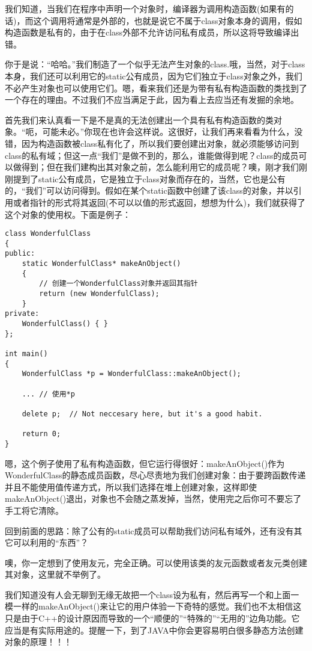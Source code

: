 我们知道，当我们在程序中声明一个对象时，编译器为调用构造函数(如果有的话)，而这个调用将通常是外部的，也就是说它不属于class对象本身的调用，假如构造函数是私有的，由于在class外部不允许访问私有成员，所以这将导致编译出错。

你于是说：“哈哈。”我们制造了一个似乎无法产生对象的class.哦，当然，对于class本身，我们还可以利用它的static公有成员，因为它们独立于class对象之外，我们不必产生对象也可以使用它们。嗯，看来我们还是为带有私有构造函数的类找到了一个存在的理由。不过我们不应当满足于此，因为看上去应当还有发掘的余地。

首先我们来认真看一下是不是真的无法创建出一个具有私有构造函数的类对象。“呃，可能未必。”你现在也许会这样说。这很好，让我们再来看看为什么，没错，因为构造函数被class私有化了，所以我们要创建出对象，就必须能够访问到class的私有域；但这一点“我们”是做不到的，那么，谁能做得到呢？class的成员可以做得到；但在我们建构出其对象之前，怎么能利用它的成员呢？噢，刚才我们刚刚提到了static公有成员，它是独立于class对象而存在的，当然，它也是公有的，“我们”可以访问得到。假如在某个static函数中创建了该class的对象，并以引用或者指针的形式将其返回(不可以以值的形式返回，想想为什么)，我们就获得了这个对象的使用权。下面是例子：

\begin{lstlisting}
class WonderfulClass
{
public:
    static WonderfulClass* makeAnObject()
    {
        // 创建一个WonderfulClass对象并返回其指针
        return (new WonderfulClass);
    }
private:
    WonderfulClass() { }
};

int main()
{
    WonderfulClass *p = WonderfulClass::makeAnObject();

    ... // 使用*p

    delete p;  // Not neccesary here, but it's a good habit.

    return 0;
}
\end{lstlisting}
嗯，这个例子使用了私有构造函数，但它运行得很好：makeAnObject()作为WonderfulClass的静态成员函数，尽心尽责地为我们创建对象：由于要跨函数传递并且不能使用值传递方式，所以我们选择在堆上创建对象，这样即使makeAnObject()退出，对象也不会随之蒸发掉，当然，使用完之后你可不要忘了手工将它清除。

回到前面的思路：除了公有的static成员可以帮助我们访问私有域外，还有没有其它可以利用的“东西”？

噢，你一定想到了使用友元，完全正确。可以使用该类的友元函数或者友元类创建其对象，这里就不举例了。

我们知道没有人会无聊到无缘无故把一个class设为私有，然后再写一个和上面一模一样的makeAnObject()来让它的用户体验一下奇特的感觉。我们也不太相信这只是由于C++的设计原因而导致的一个“顺便的”“特殊的”“无用的”边角功能。它应当是有实际用途的。提醒一下，到了JAVA中你会更容易明白很多静态方法创建对象的原理！！！

